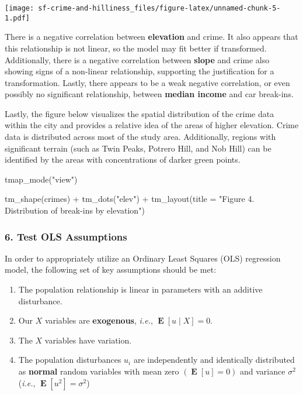 \documentclass[
]{article}
\newenvironment{Shaded}{\begin{snugshade}}{\end{snugshade}}
\newcommand{\AttributeTok}[1]{\textcolor[rgb]{0.77,0.63,0.00}{#1}}
\newcommand{\FunctionTok}[1]{\textcolor[rgb]{0.00,0.00,0.00}{#1}}
\newcommand{\NormalTok}[1]{#1}
\newcommand{\SpecialCharTok}[1]{\textcolor[rgb]{0.00,0.00,0.00}{#1}}
\newcommand{\StringTok}[1]{\textcolor[rgb]{0.31,0.60,0.02}{#1}}
\providecommand{\tightlist}{%
  \setlength{\itemsep}{0pt}\setlength{\parskip}{0pt}}
\begin{document}
\texttt{[image: sf-crime-and-hilliness\_files/figure-latex/unnamed-chunk-5-1.pdf]}

There is a negative correlation between \textbf{elevation} and crime. It
also appears that this relationship is not linear, so the model may fit
better if transformed. Additionally, there is a negative correlation
between \textbf{slope} and crime also showing signs of a non-linear
relationship, supporting the justification for a transformation. Lastly,
there appears to be a weak negative correlation, or even possibly no
significant relationship, between \textbf{median income} and car
break-ins.

Lastly, the figure below visualizes the spatial distribution of the
crime data within the city and provides a relative idea of the areas of
higher elevation. Crime data is distributed across most of the study
area. Additionally, regions with significant terrain (such as Twin
Peaks, Potrero Hill, and Nob Hill) can be identified by the areas with
concentrations of darker green points.

\begin{Shaded}
\begin{Highlighting}[]
\FunctionTok{tmap\_mode}\NormalTok{(}\StringTok{"view"}\NormalTok{)}

\FunctionTok{tm\_shape}\NormalTok{(crimes) }\SpecialCharTok{+}
  \FunctionTok{tm\_dots}\NormalTok{(}\StringTok{"elev"}\NormalTok{) }\SpecialCharTok{+}
  \FunctionTok{tm\_layout}\NormalTok{(}\AttributeTok{title =} \StringTok{"Figure 4. Distribution of break{-}ins by elevation"}\NormalTok{)}
\end{Highlighting}
\end{Shaded}

\hypertarget{test-ols-assumptions}{%
\subsubsection{6. Test OLS Assumptions}\label{test-ols-assumptions}}

In order to appropriately utilize an Ordinary Least Squares (OLS)
regression model, the following set of key assumptions should be met:

\begin{enumerate}
\def\labelenumi{\arabic{enumi}.}
\tightlist
\item
  The population relationship is linear in parameters with an additive
  disturbance.
\item
  Our \(X\) variables are \textbf{exogenous}, \emph{i.e.},
  \(\mathop{\boldsymbol{E}}\left[ u \mid X \right] = 0\).
\item
  The \(X\) variables have variation.
\item
  The population disturbances \(u_i\) are independently and identically
  distributed as \textbf{normal} random variables with mean zero
  \(\left( \mathop{\boldsymbol{E}}\left[ u \right] = 0 \right)\) and
  variance \(\sigma^2\) (\emph{i.e.},
  \(\mathop{\boldsymbol{E}}\left[ u^2 \right] = \sigma^2\))
\end{enumerate}
\end{document}

